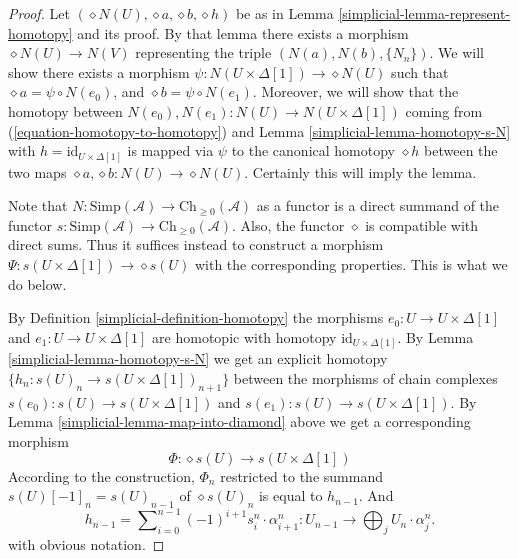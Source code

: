 \begin{proof}

Let $(\diamond N(U), \diamond a, \diamond b, \diamond h)$
be as in Lemma \ref{simplicial-lemma-represent-homotopy} and its proof. By that lemma
there exists a morphism $\diamond N(U) \to N(V)$ representing
the triple $(N(a), N(b), \{N_n\})$. We will show
there exists a morphism
$\psi : N(U \times \Delta[1]) \to \diamond{N(U)}$
such that $\diamond a = \psi \circ N(e_0)$, and
$\diamond b = \psi \circ N(e_1)$. Moreover, we will
show that the homotopy between $N(e_0), N(e_1) :
N(U) \to N(U \times \Delta[1])$ coming from
(\ref{equation-homotopy-to-homotopy}) and
Lemma \ref{simplicial-lemma-homotopy-s-N} with
$h = \text{id}_{U \times \Delta[1]}$ is mapped via
$\psi$ to the canonical homotopy $\diamond h$ between the two
maps $\diamond a, \diamond b : N(U) \to \diamond{N(U)}$. Certainly this
will imply the lemma.

\medskip\noindent
Note that $N : \text{Simp}(\mathcal{A}) \to \text{Ch}_{\geq 0}(\mathcal{A})$
as a functor is a direct summand of the functor
$s : \text{Simp}(\mathcal{A}) \to \text{Ch}_{\geq 0}(\mathcal{A})$.
Also, the functor $\diamond$ is compatible with direct sums.
Thus it suffices instead to construct a morphism
$\Psi : s(U \times \Delta[1]) \to \diamond{s(U)}$ with the
corresponding properties. This is what we do below.

\medskip\noindent
By Definition \ref{simplicial-definition-homotopy}
the morphisms $e_0 : U \to U \times \Delta[1]$
and $e_1 : U \to U \times \Delta[1]$ are homotopic
with homotopy $\text{id}_{U \times \Delta[1]}$.
By Lemma \ref{simplicial-lemma-homotopy-s-N}
we get an explicit homotopy
$\{h_n : s(U)_n \to s(U \times \Delta[1])_{n + 1}\}$
between the morphisms
of chain complexes $s(e_0) : s(U) \to s(U \times \Delta[1])$
and $s(e_1) : s(U) \to s(U \times \Delta[1])$. By
Lemma \ref{simplicial-lemma-map-into-diamond} above we get a corresponding morphism
$$
\Phi : \diamond{s(U)} \to s(U \times \Delta[1])
$$
According to the construction, $\Phi_n$ restricted to the summand
$s(U)[-1]_n = s(U)_{n - 1}$ of $\diamond{s(U)}_n$
is equal to $h_{n - 1}$. And
$$
h_{n - 1} = \sum\nolimits_{i = 0}^{n - 1}
(-1)^{i + 1} s^n_i \cdot \alpha^n_{i + 1} :
U_{n - 1} \to \bigoplus\nolimits_j U_n \cdot \alpha^n_j.
$$
with obvious notation.


\end{proof}
